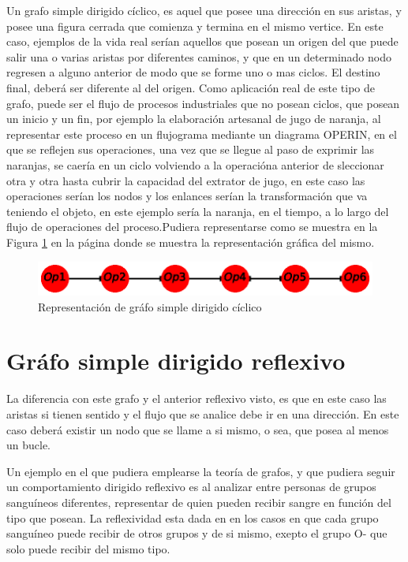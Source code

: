 \documentclass{article}
\begin{document}
Un grafo simple dirigido cíclico, es aquel que posee una dirección en sus aristas, y posee una figura cerrada que comienza y  termina en el mismo vertice.
En este caso, ejemplos de la vida real serían aquellos que posean un origen del que puede salir una o varias aristas por diferentes caminos, y que en un determinado nodo regresen a alguno anterior de modo que se forme uno o mas ciclos. El destino final, deberá ser diferente al del origen. Como aplicación real de este tipo de grafo, puede ser el flujo de procesos industriales que no posean ciclos, que posean un inicio y un fin, por ejemplo la elaboración artesanal de jugo de naranja, al representar este proceso en un flujograma mediante un diagrama OPERIN, en el que se reflejen sus operaciones, una vez que se llegue al paso de exprimir las naranjas, se caería en un ciclo volviendo a la operacióna anterior de sleccionar otra y otra hasta cubrir la capacidad del extrator de jugo, en este caso las operaciones serían los nodos  y los enlances serían la transformación que va teniendo el objeto, en este ejemplo sería la naranja, en el tiempo, a lo largo del flujo de operaciones del proceso.Pudiera representarse como se muestra en la Figura \ref{fig:Fig05} en la página \pageref{fig:Fig05} donde se muestra la representación gráfica del mismo. 



\begin{figure}
    \centering
    \includegraphics[scale=0.6]{imagenes/Fig05.eps}
    \caption{Representación de gráfo simple dirigido cíclico}
    \label{fig:Fig05}
\end{figure}

\section{Gráfo simple dirigido reflexivo}

La diferencia con este grafo y el anterior reflexivo visto, es que en este caso las aristas si tienen sentido y el flujo que se analice debe ir en una dirección. En este caso deberá existir un nodo que se llame a si mismo, o sea, que posea al menos un bucle.

Un ejemplo en el que pudiera emplearse la teoría de grafos, y que pudiera seguir un comportamiento dirigido reflexivo es al analizar entre personas de grupos sanguíneos diferentes, representar de quien pueden recibir sangre en función del tipo que posean. La reflexividad esta dada en en los casos en que cada grupo sanguíneo puede recibir de otros grupos y de si mismo, exepto el grupo O- que solo puede recibir del mismo tipo.
\end{document}
